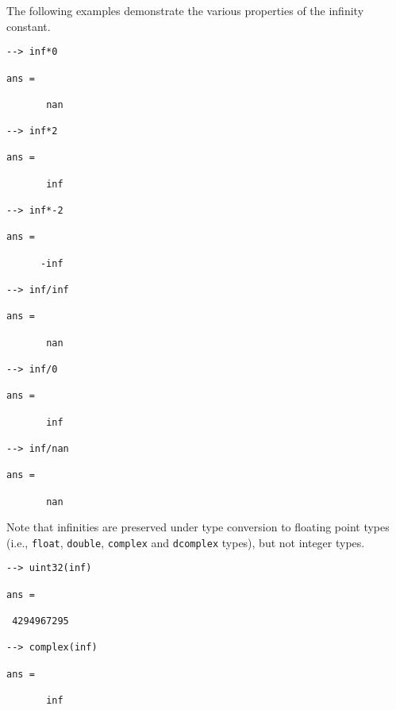 The following examples demonstrate the various properties of the infinity constant.
\begin{verbatim}
--> inf*0

ans = 

       nan 

--> inf*2

ans = 

       inf 

--> inf*-2

ans = 

      -inf 

--> inf/inf

ans = 

       nan 

--> inf/0

ans = 

       inf 

--> inf/nan

ans = 

       nan 
\end{verbatim}
Note that infinities are preserved under type conversion to floating point types (i.e., \verb|float|, \verb|double|, \verb|complex| and \verb|dcomplex| types), but not integer  types.
\begin{verbatim}
--> uint32(inf)

ans = 

 4294967295 

--> complex(inf)

ans = 

       inf 
\end{verbatim}
